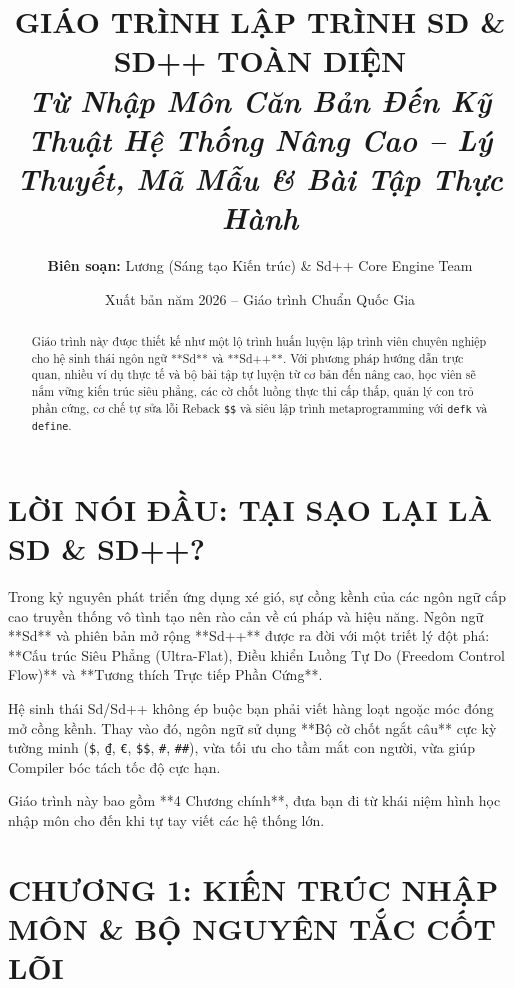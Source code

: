 \documentclass[11pt, a4paper]{article}
\title{\textbf{GIÁO TRÌNH LẬP TRÌNH SD \& SD++ TOÀN DIỆN}\\
\large\textit{Từ Nhập Môn Căn Bản Đến Kỹ Thuật Hệ Thống Nâng Cao -- Lý Thuyết, Mã Mẫu \& Bài Tập Thực Hành}}
\author{\textbf{Biên soạn:} Lương (Sáng tạo Kiến trúc) \& Sd++ Core Engine Team}
\date{Xuất bản năm 2026 -- Giáo trình Chuẩn Quốc Gia}
\begin{document}
\maketitle

\begin{abstract}
Giáo trình này được thiết kế như một lộ trình huấn luyện lập trình viên chuyên nghiệp cho hệ sinh thái ngôn ngữ **Sd** và **Sd++**. Với phương pháp hướng dẫn trực quan, nhiều ví dụ thực tế và bộ bài tập tự luyện từ cơ bản đến nâng cao, học viên sẽ nắm vững kiến trúc siêu phẳng, các cờ chốt luồng thực thi cấp thấp, quản lý con trỏ phần cứng, cơ chế tự sửa lỗi Reback \texttt{\$\$} và siêu lập trình metaprogramming với \texttt{defk} và \texttt{define}.
\end{abstract}

\tableofcontents
\newpage

\section*{LỜI NÓI ĐẦU: TẠI SẠO LẠI LÀ SD \& SD++?}

Trong kỷ nguyên phát triển ứng dụng xé gió, sự cồng kềnh của các ngôn ngữ cấp cao truyền thống vô tình tạo nên rào cản về cú pháp và hiệu năng. Ngôn ngữ **Sd** và phiên bản mở rộng **Sd++** được ra đời với một triết lý đột phá: **Cấu trúc Siêu Phẳng (Ultra-Flat), Điều khiển Luồng Tự Do (Freedom Control Flow)** và **Tương thích Trực tiếp Phần Cứng**.

Hệ sinh thái Sd/Sd++ không ép buộc bạn phải viết hàng loạt ngoặc móc đóng mở cồng kềnh. Thay vào đó, ngôn ngữ sử dụng **Bộ cờ chốt ngắt câu** cực kỳ tường minh (\texttt{\$}, \texttt{₫}, \texttt{€}, \texttt{\$\$}, \texttt{\#}, \texttt{\#\#}), vừa tối ưu cho tầm mắt con người, vừa giúp Compiler bóc tách tốc độ cực hạn.

Giáo trình này bao gồm **4 Chương chính**, đưa bạn đi từ khái niệm hình học nhập môn cho đến khi tự tay viết các hệ thống lớn.

\section{CHƯƠNG 1: KIẾN TRÚC NHẬP MÔN \& BỘ NGUYÊN TẮC CỐT LÕI}
\end{document}
